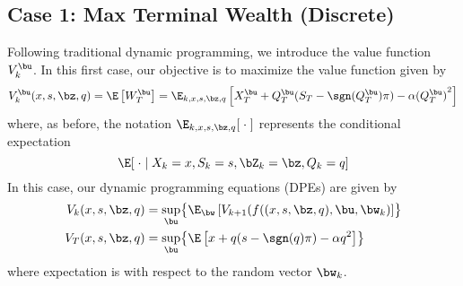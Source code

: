 \documentclass[12pt]{article}
\begin{document}
\subsection*{Case 1: Max Terminal Wealth (Discrete)}
Following traditional dynamic programming, we introduce the value function $V_k^{\bu}$. In this first case, our objective is to maximize the value function given by
\begin{equation}
V_k^{\bu} (x,s,\bz,q) = \E \left[ W_T^{\bu} \right] = \E_{k,x,s,\bz,q}\left[ X_T^{\bu} + Q_T^{\bu}(S_T - \sgn(Q_T^{\bu})\pi) - \alpha {(Q_T^{\bu})}^2 \right]
\end{equation}
where, as before, the notation $\E_{k,x,s,\bz,q}[ \; \cdot \; ]$ represents the conditional expectation
\[ \E [ \; \cdot \; | \; X_k = x, S_k = s, \bZ_k = \bz, Q_k = q] \]
In this case, our dynamic programming equations (DPEs) are given by
\begin{align}
V_k (x,s,\bz,q) & = \sup_{\bu} \bigl\lbrace \E_{\bw} \left[ V_{k+1} (f((x,s,\bz,q),\bu,\bw_k) \right] \bigr\rbrace \\
V_T (x,s,\bz,q) & = \sup_{\bu} \bigl\lbrace \E \left[ x + q(s-\sgn(q)\pi) - \alpha q^2 \right] \bigr\rbrace
\end{align}
where expectation is with respect to the random vector $\bw_k$.
\end{document}
